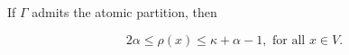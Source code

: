 If $\Gamma$ admits the atomic partition, then

$$2\alpha \leq \rho(x) \leq \kappa + \alpha - 1, \text{ for all } x \in V.$$
